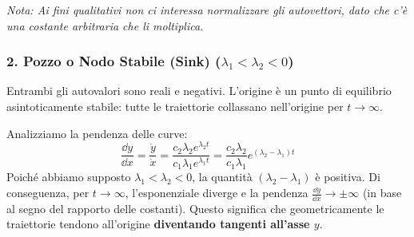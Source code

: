 \documentclass[openany]{book}
\theoremstyle{definition}
\theoremstyle{remark}
\begin{document}
\textit{Nota: Ai fini qualitativi non ci interessa normalizzare gli autovettori, dato che c'è una costante arbitraria che li moltiplica.}

\subsubsection*{2. Pozzo o Nodo Stabile (Sink) ($\lambda_1 < \lambda_2 < 0$)}
Entrambi gli autovalori sono reali e negativi. L'origine è un punto di equilibrio asintoticamente stabile: tutte le traiettorie collassano nell'origine per $t \to \infty$. 

Analizziamo la pendenza delle curve:
\begin{equation}
    \frac{\dd y}{\dd x} = \frac{\dot{y}}{\dot{x}} = \frac{c_2 \lambda_2 e^{\lambda_2 t}}{c_1 \lambda_1 e^{\lambda_1 t}} = \frac{c_2 \lambda_2}{c_1 \lambda_1} e^{(\lambda_2 - \lambda_1)t}
\end{equation}
Poiché abbiamo supposto $\lambda_1 < \lambda_2 < 0$, la quantità $(\lambda_2 - \lambda_1)$ è positiva. 
Di conseguenza, per $t \to \infty$, l'esponenziale diverge e la pendenza $\frac{\dd y}{\dd x} \to \pm \infty$ (in base al segno del rapporto delle costanti). Questo significa che geometricamente le traiettorie tendono all'origine \textbf{diventando tangenti all'asse $y$}.

\begin{center}
\end{center}
\end{document}
